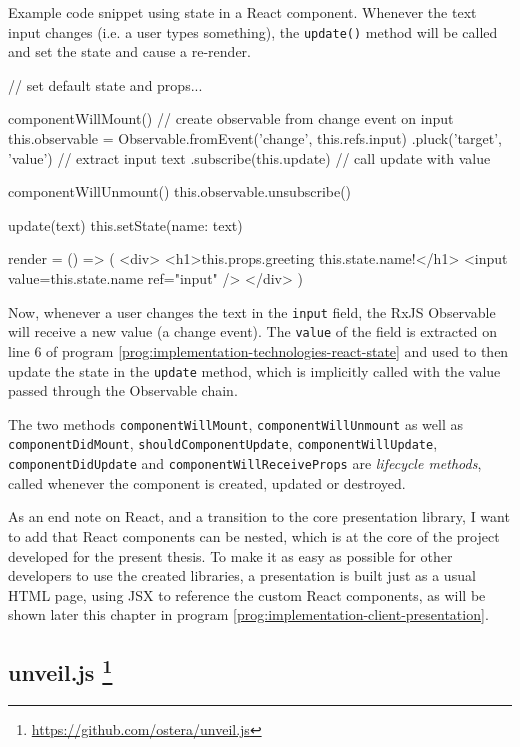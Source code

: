 \begin{program}
\caption{Example code snippet using state in a React component. Whenever the text input changes (i.e. a user types something), the \texttt{update()} method will be called and set the state and cause a re-render.}
\label{prog:implementation-technologies-react-state}
\begin{JsCode}
// set default state and props...

componentWillMount() {
  // create observable from change event on input
  this.observable = Observable.fromEvent('change', this.refs.input)
    .pluck('target', 'value') // extract input text
    .subscribe(this.update) // call update with value
}

componentWillUnmount() { this.observable.unsubscribe() }

update(text) { this.setState({name: text}) }

render = () => (
  <div>
    <h1>{this.props.greeting} {this.state.name}!</h1>
    <input value={this.state.name} ref="input" />
  </div>
)
\end{JsCode}
\end{program}
%
Now, whenever a user changes the text in the \texttt{input} field, the RxJS Observable will receive a new value (a change event). The \texttt{value} of the field is extracted on line $6$ of program \ref{prog:implementation-technologies-react-state} and used to then update the state in the \texttt{update} method, which is implicitly called with the value passed through the Observable chain.

The two methods \texttt{com\-po\-nent\-Will\-Mount}, \texttt{com\-po\-nent\-Will\-Un\-mount} as well as \texttt{com\-po\-nent\-Did\-Mount}, \texttt{should\-Com\-po\-nent\-Up\-date}, \texttt{com\-po\-nent\-Will\-Up\-date}, \texttt{com\-po\-nent\-Did\-Up\-date} and \texttt{com\-po\-nent\-Will\-Re\-ceive\-Props} are \emph{lifecycle methods}, called whenever the component is created, updated or destroyed.

As an end note on React, and a transition to the core presentation library, I want to add that React components can be nested, which is at the core of the project developed for the present thesis. To make it as easy as possible for other developers to use the created libraries, a presentation is built just as a usual HTML page, using JSX to reference the custom React components, as will be shown later this chapter in program \ref{prog:implementation-client-presentation}.

\subsection[unveil.js]%
             {unveil.js%
             \protect\footnote{\url{https://github.com/ostera/unveil.js}}}    
\label{sec:implementation-technologies-unveil}

